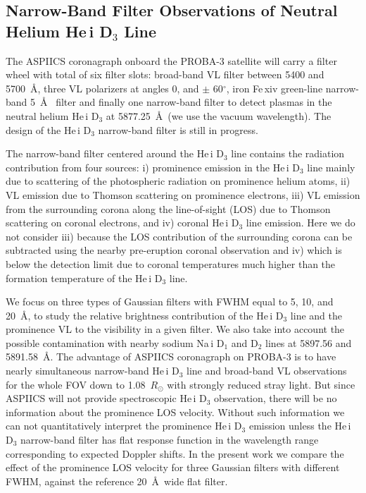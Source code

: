 \documentclass[namedreferences]{solarphysics}
\begin{document}
\begin{article}
\section{Narrow-Band Filter Observations of Neutral Helium He\,{\sc i} D$_{3}$ Line}
	\label{s-nbf}

The ASPIICS coronagraph onboard the PROBA-3 satellite will carry a filter wheel with total of six filter slots: broad-band VL filter between 5400 and 5700~\AA, three VL polarizers at angles 0, and $\pm$ 60$^\circ$, iron Fe\,{\sc xiv} green-line narrow-band 5~\AA~ filter and finally one narrow-band filter to detect plasmas in  
the neutral helium  He\,{\sc i} D$_{3}$ at 5877.25~\AA~(we use the vacuum wavelength). 
The design of the He\,{\sc i} D$_{3}$ narrow-band filter is still in progress. 

The narrow-band filter centered around the He\,{\sc i} D$_{3}$ line contains the radiation contribution from four sources:
i) prominence emission in the He\,{\sc i} D$_{3}$ line mainly due to scattering of the photospheric radiation on prominence helium atoms, ii) VL 
emission due to Thomson scattering on prominence electrons, iii) VL emission from the surrounding corona along the line-of-sight (LOS) due to
Thomson scattering on coronal electrons, and iv) coronal He\,{\sc i} D$_{3}$ line emission. Here we do not consider iii) because the LOS contribution of 
the surrounding corona can be subtracted using the nearby pre-eruption coronal observation and iv) which is below the detection limit due to coronal 
temperatures much higher than the formation temperature of the He\,{\sc i} D$_{3}$ line.

We focus on three types of Gaussian filters with FWHM equal to 5, 10, and 20~\AA, to study the relative brightness contribution of  
the He\,{\sc i} D$_{3}$ line and the prominence VL to the visibility in a given filter. We also take into account the possible 
contamination with nearby sodium Na\,{\sc i} D$_{1}$ and D$_{2}$ lines at 5897.56 and 5891.58~\AA. 
The advantage of ASPIICS coronagraph on PROBA-3 is to have nearly simultaneous narrow-band He\,{\sc i} D$_{3}$ line and broad-band VL 
observations for the whole FOV down to 1.08~$R_\odot$ with strongly reduced stray light. But since ASPIICS  will not provide 
spectroscopic He\,{\sc i} D$_{3}$ observation, there will be no information about the prominence LOS velocity. Without such information we can not 
quantitatively interpret the prominence He\,{\sc i} D$_{3}$ emission unless the He\,{\sc i} D$_{3}$ narrow-band filter has flat response function in the 
wavelength range corresponding to expected Doppler shifts. In the present work we compare the effect of the prominence LOS velocity for three Gaussian 
filters with different FWHM, against the reference 20~\AA~wide flat filter.  


\end{article}
\end{document}
